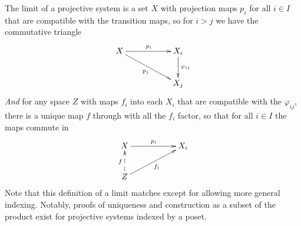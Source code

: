         The limit of a projective system is a set $X$ with projection maps $p_i$ for all $i\in I$ that are compatible with the transition maps, so for $i>j$ we have the commutative triangle
        \begin{displaymath}
          \xymatrix{
            X \ar[rr]^{p_i} \ar[drr]_{p_j} && X_i \ar[d]^{\varphi_{ij}} \\
            && X_j
          }
        \end{displaymath}
        \emph{And} for any space $Z$ with maps $f_i$ into each $X_i$ that are compatible with the $\varphi_{ij}$, there is a unique map $f$ through with all the $f_i$ factor, so that for all $i\in I$ the maps commute in
        \begin{displaymath}
          \xymatrix{
            X \ar[rr]^{p_i} && X_i  \\
            Z \ar@{-->}[u]^f \ar[urr]_{f_i} 
          }
        \end{displaymath}
        Note that this definition of a limit matches  except for allowing more general indexing.
        Notably, proofs of uniqueness and construction as a subset of the product exist for projective systems indexed by a poset.
        
